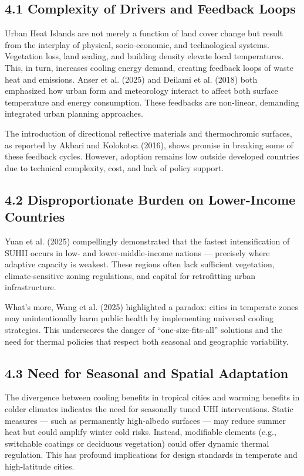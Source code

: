 \documentclass[draft]{agujournal}
\begin{document}
\subsection*{4.1 Complexity of Drivers and Feedback Loops}
Urban Heat Islands are not merely a function of land cover change but result from the interplay of physical, socio-economic, and technological systems. Vegetation loss, land sealing, and building density elevate local temperatures. This, in turn, increases cooling energy demand, creating feedback loops of waste heat and emissions. Anser et al. (2025) and Deilami et al. (2018) both emphasized how urban form and meteorology interact to affect both surface temperature and energy consumption. These feedbacks are non-linear, demanding integrated urban planning approaches.

The introduction of directional reflective materials and thermochromic surfaces, as reported by Akbari and Kolokotsa (2016), shows promise in breaking some of these feedback cycles. However, adoption remains low outside developed countries due to technical complexity, cost, and lack of policy support.

\subsection*{4.2 Disproportionate Burden on Lower-Income Countries}
Yuan et al. (2025) compellingly demonstrated that the fastest intensification of SUHII occurs in low- and lower-middle-income nations — precisely where adaptive capacity is weakest. These regions often lack sufficient vegetation, climate-sensitive zoning regulations, and capital for retrofitting urban infrastructure.

What’s more, Wang et al. (2025) highlighted a paradox: cities in temperate zones may unintentionally harm public health by implementing universal cooling strategies. This underscores the danger of “one-size-fits-all” solutions and the need for thermal policies that respect both seasonal and geographic variability.

\subsection*{4.3 Need for Seasonal and Spatial Adaptation}
The divergence between cooling benefits in tropical cities and warming benefits in colder climates indicates the need for seasonally tuned UHI interventions. Static measures — such as permanently high-albedo surfaces — may reduce summer heat but could amplify winter cold risks. Instead, modifiable elements (e.g., switchable coatings or deciduous vegetation) could offer dynamic thermal regulation. This has profound implications for design standards in temperate and high-latitude cities.
\end{document}
